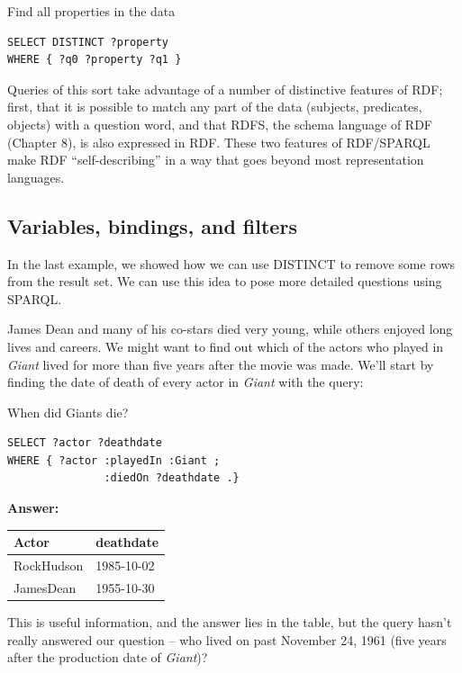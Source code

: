 \begin{query}Find all properties in the data\end{query}
\begin{lstlisting}
SELECT DISTINCT ?property
WHERE { ?q0 ?property ?q1 }
\end{lstlisting}

Queries of this sort take advantage of a number of distinctive features
of RDF; first, that it is possible to match any part of the data
(subjects, predicates, objects) with a question word, and that RDFS, the
schema language of RDF (Chapter 8), is also expressed in RDF. These two
features of RDF/SPARQL make RDF ``self-describing'' in a way that goes
beyond most representation languages.

\subsection{Variables, bindings, and filters}

In the last example, we showed how we can use DISTINCT to remove some
rows from the result set. We can use this idea to pose more detailed
questions using SPARQL.

James Dean and many of his co-stars died very young, while others
enjoyed long lives and careers. We might want to find out which of the
actors who played in \emph{Giant} lived for more than five years after
the movie was made. We'll start by finding the date of death of every
actor in \emph{Giant} with the query:

\begin{query}When did Giants die?\end{query}

\begin{lstlisting}
SELECT ?actor ?deathdate
WHERE { ?actor :playedIn :Giant ;
               :diedOn ?deathdate .}
\end{lstlisting}

\textbf{\textbf{Answer:}}

\begin{tabular}{|ll|}
\hline
Actor&deathdate\\
\hline
RockHudson&1985-10-02\\
JamesDean&1955-10-30\\

\hline
\end{tabular}


This is useful information, and the answer lies in the table, but the
query hasn't really answered our question -- who lived on past November
24, 1961 (five years after the production date of \emph{Giant})?

